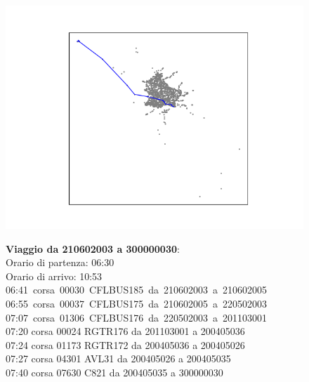 \documentclass{article}
\begin{document}
\begin{figure}[H]
	\begin{minipage}{0.55\linewidth}
		\centering
		\hspace*{-3cm}\includegraphics[width=1.0\linewidth, valign=t]{figures/210602003_300000030}
	\end{minipage}
	\hspace*{-2cm}\begin{minipage}{0.7\linewidth}
		\textbf{Viaggio da 210602003 a 300000030}:\\
		Orario di partenza: 06:30\\
		Orario di arrivo: 10:53\\
		\mbox{06:41 corsa 00030 CFLBUS185 da 210602003 a 210602005}\\
		\mbox{06:55 corsa 00037 CFLBUS175 da 210602005 a 220502003}\\
		\mbox{07:07 corsa 01306 CFLBUS176 da 220502003 a 201103001}\\
		07:20 corsa 00024 RGTR176 da 201103001 a 200405036\\
		07:24 corsa 01173 RGTR172 da 200405036 a 200405026\\
		07:27 corsa 04301 AVL31 da 200405026 a 200405035\\
		07:40 corsa 07630 C821 da 200405035 a 300000030
			\end{minipage}
\end{figure}
\end{document}
